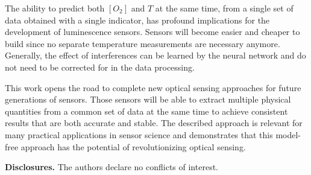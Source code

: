 \documentclass[final,5p,times,twocolumn]{elsarticle}
\begin{document}
The ability to predict both $[O_2]$ and $T$ at the same time, from a single set of data obtained with a single indicator, has profound implications for the development of luminescence sensors. Sensors will become easier and cheaper to build since no separate temperature measurements are necessary anymore. Generally, the effect of interferences can be learned by the neural network and do not need to be corrected for in the data processing. 

This work opens the road to complete new optical sensing approaches for future generations of sensors. Those sensors will be able to extract multiple physical quantities from a common set of data at the same time to achieve consistent results that are both accurate and stable. The described approach is relevant for many practical applications in sensor science and demonstrates that this model-free approach has the potential of revolutionizing optical sensing.






\medskip

\noindent\textbf{Disclosures.} The authors declare no conflicts of interest.









\end{document}
